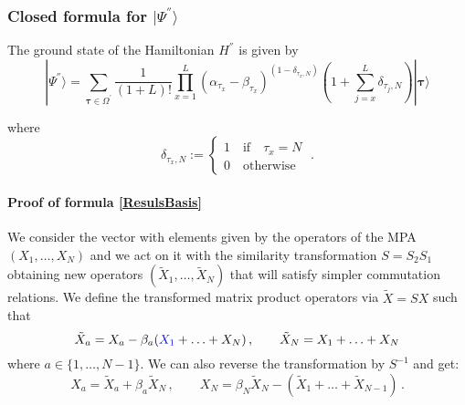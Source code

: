 \documentclass[10pt]{article}
\numberwithin{equation}{section}
\numberwithin{equation}{subsection}
\newcommand{\Xt}{\widetilde{X}}
\newcommand{\dt}{\;.}
\newcommand{\fra}[1]{\textcolor[rgb]{0,0,1}{#1}}
\begin{document}
\subsubsection{Closed formula for $|\Psi^{''}\rangle$}\label{subsectionSSHsec}

The ground state of the Hamiltonian $H^{''}$ is given by 
\begin{equation}\label{ResulsBasis}
	|\Psi^{''} \rangle= \sum_{\bm{\tau}\in \Omega^{'}}\frac{1}{\left(1+L\right)!}\prod_{x=1}^{L} (\alpha_{\tau_{x}}-\beta_{\tau_{x}})^{(1-\delta_{\tau_{x},N})}\left(1+\sum_{j=x}^{L}\delta_{\tau_{j},N}\right) |\bm{\tau}\rangle
\end{equation}

where 
\begin{equation}
    \delta_{\tau_{x},N}:=\begin{cases}
        1\quad \text{if}\quad \tau_{x}=N\\
        0\quad \text{otherwise}
    \end{cases}\dt
\end{equation} 


\paragraph{Proof of formula \eqref{ResulsBasis}}  
We consider the vector with elements given by the operators of the MPA $(X_{1},\ldots,X_{N})$ and we act on it with the similarity transformation $S=S_{2}S_{1}$ obtaining new operators $(\Xt_{1},\ldots,\Xt_{N})$ that will satisfy simpler commutation relations. 
We define the transformed matrix product operators
via $\tilde X=S X$ such that
\begin{equation}\label{Xtildes2b}
 \tilde X_a=X_{a}-\beta_{a}(\fra{X_{1}}+\ldots+X_{N})\,,\qquad \tilde X_N= 
				X_{1}+\ldots +X_{N}
\end{equation} 
where  $ a\in \{1,\ldots,N-1\}$.
We can also reverse the transformation by $S^{-1}$ and get: 
\begin{equation}\label{Xes}
 X_{a}=	\Xt_{a}+\beta_{a}\Xt_{N}\,,\qquad
	X_{N} = \beta_N\Xt_{N}-(\Xt_{1}+\ldots+\Xt_{N-1})\,.
\end{equation}
\end{document}
